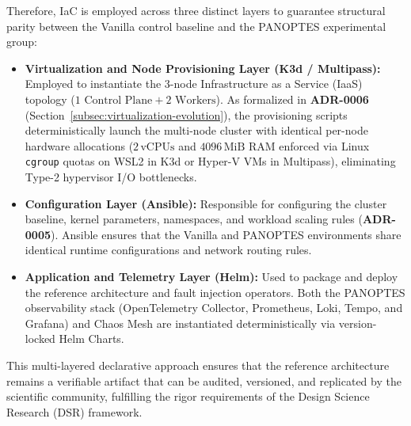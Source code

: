 Therefore, IaC is employed across three distinct layers to guarantee structural parity between the Vanilla control baseline and the PANOPTES experimental group:

\begin{itemize}
    \item \textbf{Virtualization and Node Provisioning Layer (K3d / Multipass):} Employed to instantiate the 3-node Infrastructure as a Service (IaaS) topology ($1\text{ Control Plane} + 2\text{ Workers}$). As formalized in \textbf{ADR-0006} (Section~\ref{subsec:virtualization-evolution}), the provisioning scripts deterministically launch the multi-node cluster with identical per-node hardware allocations ($2\,\text{vCPUs}$ and $4096\,\text{MiB}$ RAM enforced via Linux \texttt{cgroup} quotas on WSL2 in K3d or Hyper-V VMs in Multipass), eliminating Type-2 hypervisor I/O bottlenecks.
    \item \textbf{Configuration Layer (Ansible):} Responsible for configuring the cluster baseline, kernel parameters, namespaces, and workload scaling rules (\textbf{ADR-0005}). Ansible ensures that the Vanilla and PANOPTES environments share identical runtime configurations and network routing rules.
    \item \textbf{Application and Telemetry Layer (Helm):} Used to package and deploy the reference architecture and fault injection operators. Both the PANOPTES observability stack (OpenTelemetry Collector, Prometheus, Loki, Tempo, and Grafana) and Chaos Mesh are instantiated deterministically via version-locked Helm Charts.
\end{itemize}

This multi-layered declarative approach ensures that the reference architecture remains a verifiable artifact that can be audited, versioned, and replicated by the scientific community, fulfilling the rigor requirements of the Design Science Research (DSR) framework.
